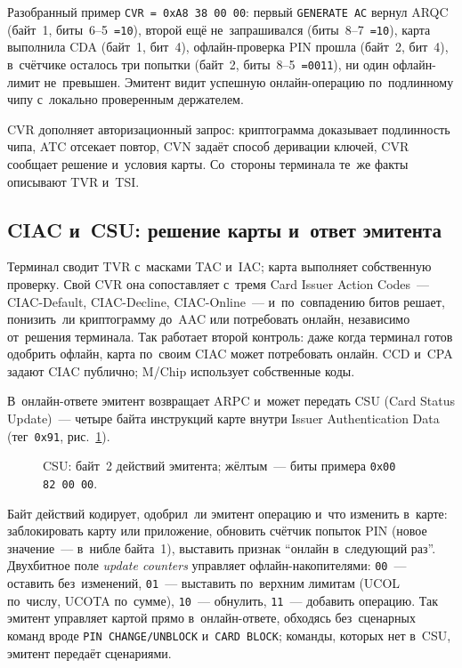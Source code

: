 Разобранный пример \texttt{CVR = 0xA8\,38\,00\,00}: первый \texttt{GENERATE AC}
вернул ARQC (байт~1, биты~6--5~\texttt{=10}), второй ещё не~запрашивался
(биты~8--7~\texttt{=10}), карта выполнила CDA (байт~1,
бит~4), офлайн-проверка PIN прошла (байт~2, бит~4), в~счётчике осталось три
попытки (байт~2, биты~8--5~\texttt{=0011}), ни один офлайн-лимит не~превышен.
Эмитент видит успешную онлайн-операцию по~подлинному чипу с~локально проверенным
держателем.

CVR дополняет авторизационный запрос: криптограмма доказывает подлинность чипа,
ATC отсекает повтор, CVN задаёт способ деривации ключей, CVR сообщает решение
и~условия карты. Со~стороны терминала те~же факты описывают TVR и~TSI.

\subsection*{CIAC и~CSU: решение карты и~ответ эмитента}\label{sec:emv-ciac-csu}

Терминал сводит TVR с~масками TAC и~IAC; карта
выполняет собственную проверку. Свой CVR она сопоставляет с~тремя Card Issuer Action
Codes~--- CIAC-Default, CIAC-Decline, CIAC-Online~--- и~по~совпадению битов
решает, понизить~ли криптограмму до~AAC или потребовать онлайн, независимо
от~решения терминала. Так работает второй контроль: даже когда терминал
готов одобрить офлайн, карта по~своим CIAC может потребовать онлайн. CCD и~CPA задают CIAC
публично; M\slash Chip использует собственные коды.

В~онлайн-ответе эмитент возвращает ARPC и~может передать CSU (Card Status
Update)~--- четыре байта инструкций карте внутри Issuer Authentication Data
(тег~\texttt{0x91}, рис.~\ref{fig:csu-anatomy}).

\begin{figure}[htbp]
  \centering
  \caption{CSU: байт~2 действий эмитента; жёлтым~--- биты примера \texttt{0x00\,82\,00\,00}.}\label{fig:csu-anatomy}
\end{figure}

Байт действий кодирует, одобрил~ли эмитент операцию и~что изменить в~карте:
заблокировать карту или приложение, обновить счётчик попыток PIN (новое
значение~--- в~нибле байта~1), выставить признак \enquote{онлайн в~следующий
раз}. Двухбитное поле \emph{update counters} управляет офлайн-накопителями:
\texttt{00}~--- оставить без~изменений, \texttt{01}~--- выставить по~верхним лимитам
(UCOL по~числу, UCOTA по~сумме), \texttt{10}~--- обнулить, \texttt{11}~---
добавить операцию. Так эмитент управляет картой прямо в~онлайн-ответе, обходясь
без~сценарных команд вроде \texttt{PIN CHANGE/UNBLOCK} и~\texttt{CARD BLOCK};
команды, которых нет в~CSU, эмитент передаёт сценариями.

